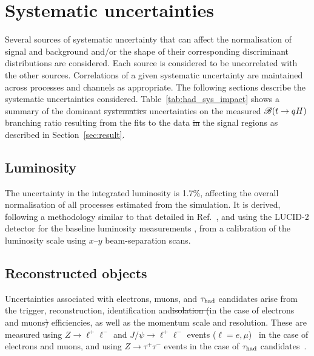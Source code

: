 \documentclass[PAPER, coverpage, atlasdraft=true, texlive=2016, UKenglish]{\ATLASLATEXPATH atlasdoc}
\providecommand{\DIFadd}[1]{{\protect\color{blue}\uwave{#1}}} %
\providecommand{\DIFdel}[1]{{\protect\color{red}\sout{#1}}}                      %
\providecommand{\DIFaddbegin}{} %
\providecommand{\DIFaddend}{} %
\providecommand{\DIFdelbegin}{} %
\providecommand{\DIFdelend}{} %
\begin{document}
\section{Systematic uncertainties}
\label{sec:systematics}

Several sources of systematic uncertainty that can affect the normalisation of signal 
and background and/or the shape of their corresponding discriminant distributions are considered.
Each source is considered to be uncorrelated with the other sources.  
Correlations of a given systematic uncertainty are maintained across processes and channels 
as appropriate. The following sections describe the systematic uncertainties considered.
Table~\ref{tab:had_sys_impact} shows a summary of the dominant \DIFdelbegin \DIFdel{systematics }\DIFdelend \DIFaddbegin \DIFadd{systematic }\DIFaddend uncertainties on the measured $\mathscr{B}(t\to qH)$ branching ratio
resulting from the fits to the data \DIFdelbegin \DIFdel{in }\DIFdelend \DIFaddbegin \DIFadd{on }\DIFaddend the signal regions as described in Section~\ref{sec:result}.

\subsection{Luminosity}
\label{sec:syst_lumi}

The uncertainty in the integrated luminosity is 1.7\%, affecting the overall normalisation of all processes estimated from the simulation. 
It is derived, following a methodology similar to that detailed in Ref.~\cite{Aaboud:2016hhf}, and using the LUCID-2 detector 
for the baseline luminosity measurements \cite{Avoni:2018iuv}, from a calibration of the luminosity scale using $x$--$y$ beam-separation scans.

\subsection{Reconstructed objects}
\label{sec:syst_objects}

Uncertainties associated with electrons, muons, and $\tau_{\mathrm{had}}$ candidates arise from the trigger, reconstruction,  
identification and\DIFdelbegin \DIFdel{isolation (}\DIFdelend \DIFaddbegin \DIFadd{, }\DIFaddend in the case of electrons and muons\DIFdelbegin \DIFdel{) }\DIFdelend \DIFaddbegin \DIFadd{, isolation }\DIFaddend efficiencies, as well as the momentum scale and resolution. 
These are measured using $Z\to \ell^+\ell^-$ and $J/\psi\to \ell^+\ell^-$ events ($\ell =e, \mu$)~\cite{ATLAS-CONF-2016-024,Aad:2016jkr} 
in the case of electrons and muons, and using $Z\to \tau^+\tau^-$ events in the case of $\tau_{\mathrm{had}}$ candidates~\cite{ATLAS-CONF-2017-029}.
\end{document}
